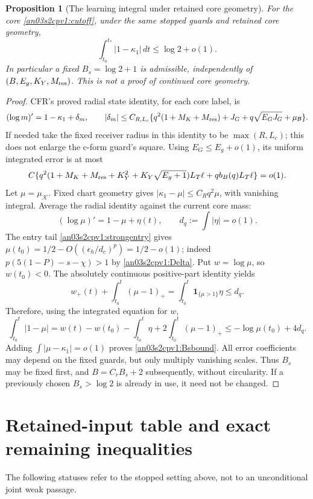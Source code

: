 \documentclass[11pt]{article}
\newtheorem{proposition}[theorem]{Proposition}
\theoremstyle{remark}\newtheorem{remark}[theorem]{Remark}
\newcommand{\dd}{\,d}
\newcommand{\KK}{\mathcal K}
\newcommand{\BB}{\mathcal B}
\begin{document}
\begin{proposition}[The learning integral under retained core geometry]
\label{an03s2cpv1:Bs}
For the core \eqref{an03s2cpv1:cutoff}, under the same stopped
guards and retained core geometry,
\begin{equation}
 \int_{t_0}^{t_*}|1-\kappa_1|\dd t\le\log2+o(1).
 \label{an03s2cpv1:Bsbound}
\end{equation}
In particular a fixed $B_s=\log2+1$ is admissible, independently
of $(B,E_g,K_Y,M_{\rm res})$. This is not a proof of continued
core geometry.
\end{proposition}
\begin{proof}
CFR's proved radial state identity, for each core label, is
\[
 (\log m)'=1-\kappa_1+\delta_m,\qquad
 |\delta_m|\le C_{R,L_c}\{q^2(1+M_K+M_{\rm res})
                   +J_G+q\sqrt{E_GJ_G}+\mu_{\BB}\}.
\]
If needed take the fixed receiver radius in this identity to be
$\max(R,L_c)$; this does not enlarge the c-form guard's square.
Using $E_G\le E_g+o(1)$, its uniform integrated error is at most
\begin{equation}
 C\{q^2(1+M_K+M_{\rm res}+K_Y^2+K_Y\sqrt{E_g+1})L_T\ell
                +q b_B(q)L_T\ell\}=o(1).
 \label{an03s2cpv1:radialerror}
\end{equation}
Let $\mu=\mu_{\KK}$. Fixed chart geometry gives
$|\kappa_1-\mu|\le C_Rq^2\mu$, with vanishing integral.
Average the radial identity against the current core mass:
\[
 (\log\mu)'=1-\mu+\eta(t),\qquad
 d_q:=\int|\eta|=o(1).
\]
The entry tail \eqref{an03s2cpv1:strongentry} gives
$\mu(t_0)=1/2-O((\epsilon_h/d_c)^p)=1/2-o(1)$;
indeed $p(5(1-P)-s-\chi)>1$ by
\eqref{an03s2cpv1:Delta}. Put $w=\log\mu$, so $w(t_0)<0$.
The absolutely continuous positive-part identity yields
\[
 w_+(t)+\int_{t_0}^t(\mu-1)_+
       =\int_{t_0}^t\mathbf1_{\{\mu>1\}}\eta\le d_q.
\]
Therefore, using the integrated equation for $w$,
\[
 \int_{t_0}^t|1-\mu|
 =w(t)-w(t_0)-\int_{t_0}^t\eta
                   +2\int_{t_0}^t(\mu-1)_+
 \le-\log\mu(t_0)+4d_q.
\]
Adding $\int|\mu-\kappa_1|=o(1)$ proves
\eqref{an03s2cpv1:Bsbound}. All error coefficients may depend
on the fixed guards, but only multiply vanishing scales.
Thus $B_s$ may be fixed first, and $B=C_rB_s+2$ subsequently,
without circularity. If a previously chosen $B_s>\log2$ is
already in use, it need not be changed.
\end{proof}

\section{Retained-input table and exact remaining inequalities}
\label{an03s2cpv1:audit}
The following statuses refer to the stopped setting above,
not to an unconditional joint weak passage.
\end{document}
